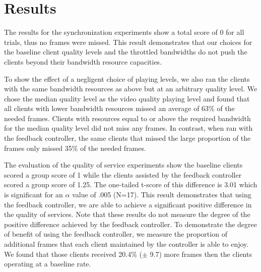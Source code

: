 \documentclass{sig-alternate}
\begin{document}

\section{Results} \label{results}

The results for the synchronization experiments show a total score of
0 for all trials, thus no frames were missed.  This result
demonstrates that our choices for the baseline client quality levels
and the throttled bandwidths do not push the clients beyond their
bandwidth resource capacities.

To show the effect of a negligent choice of playing levels, we also
ran the clients with the same bandwidth resources as above but at an
arbitrary quality level.  We chose the median quality level as the
video quality playing level and found that all clients with lower
bandwidth resources missed an average of 63\% of the needed frames.
Clients with resources equal to or above the required bandwidth for
the median quality level did not miss any frames.  In contrast, when
ran with the feedback controller, the same clients that missed the
large proportion of the frames only missed 35\% of the needed frames.

The evaluation of the quality of service experiments show the baseline
clients scored a group score of 1 while the clients assisted by the
feedback controller scored a group score of 1.25.  The one-tailed
t-score of this difference is 3.01 which is significant for an
$\alpha$ value of .005 (N=17).  This result demonstrates that using
the feedback controller, we are able to achieve a significant positive
difference in the quality of services.  Note that these results do not
measure the degree of the positive difference achieved by the feedback
controller.  To demonstrate the degree of benefit of using the
feedback controller, we measure the proportion of additional frames
that each client maintained by the controller is able to enjoy.  We
found that those clients received 20.4\% ($\pm$ 9.7) more frames then
the clients operating at a baseline rate.
\end{document}
